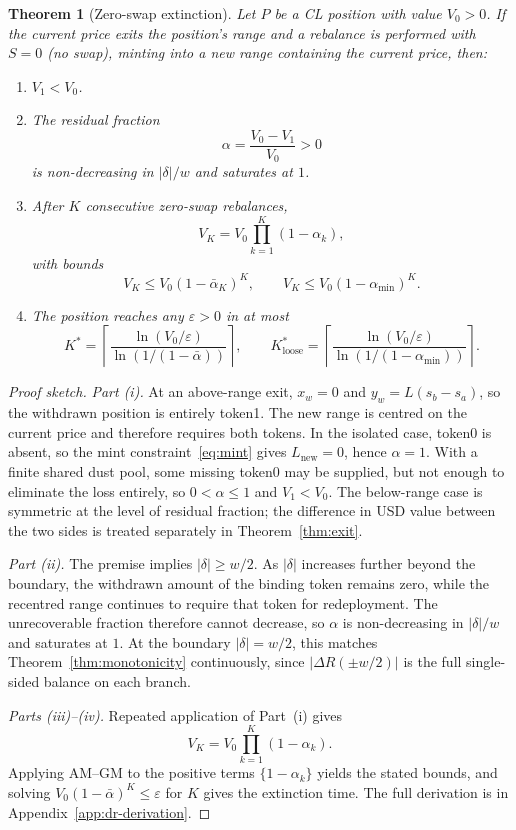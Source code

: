 \documentclass[11pt,a4paper]{article}
\theoremstyle{plain}
\newtheorem{theorem}{Theorem}
\begin{document}
\begin{theorem}[Zero-swap extinction]\label{thm:extinction}
Let $P$ be a CL position with value $V_0 > 0$. If the current price exits the position's range and a rebalance is performed with $S = 0$ (no swap), minting into a new range containing the current price, then:
\begin{enumerate}
\item $V_1 < V_0$.

\item The residual fraction
\[
\alpha = \frac{V_0 - V_1}{V_0} > 0
\]
is non-decreasing in $|\delta|/w$ and saturates at $1$.

\item After $K$ consecutive zero-swap rebalances,
\[
V_K = V_0 \prod_{k=1}^{K} (1 - \alpha_k),
\]
with bounds
\[
V_K \leq V_0(1 - \bar\alpha_K)^K,
\qquad
V_K \leq V_0(1 - \alpha_{\min})^K.
\]

\item The position reaches any $\varepsilon > 0$ in at most
\[
K^* = \left\lceil \frac{\ln(V_0/\varepsilon)}{\ln(1/(1 - \bar\alpha))} \right\rceil,
\qquad
K^*_{\text{loose}} = \left\lceil \frac{\ln(V_0/\varepsilon)}{\ln(1/(1 - \alpha_{\min}))} \right\rceil.
\]
\end{enumerate}
\end{theorem}

\begin{proof}[Proof sketch]
\emph{Part (i).} At an above-range exit, $x_w = 0$ and $y_w = L(s_b - s_a)$, so the withdrawn position is entirely token1. The new range is centred on the current price and therefore requires both tokens. In the isolated case, token0 is absent, so the mint constraint~\eqref{eq:mint} gives $L_{\text{new}} = 0$, hence $\alpha = 1$. With a finite shared dust pool, some missing token0 may be supplied, but not enough to eliminate the loss entirely, so $0 < \alpha \leq 1$ and $V_1 < V_0$. The below-range case is symmetric at the level of residual fraction; the difference in USD value between the two sides is treated separately in Theorem~\ref{thm:exit}.

\emph{Part (ii).} The premise implies $|\delta| \geq w/2$. As $|\delta|$ increases further beyond the boundary, the withdrawn amount of the binding token remains zero, while the recentred range continues to require that token for redeployment. The unrecoverable fraction therefore cannot decrease, so $\alpha$ is non-decreasing in $|\delta|/w$ and saturates at $1$. At the boundary $|\delta| = w/2$, this matches Theorem~\ref{thm:monotonicity} continuously, since $|\Delta R(\pm w/2)|$ is the full single-sided balance on each branch.

\emph{Parts (iii)--(iv).} Repeated application of Part~(i) gives
\[
V_K = V_0 \prod_{k=1}^{K} (1 - \alpha_k).
\]
Applying AM--GM to the positive terms $\{1 - \alpha_k\}$ yields the stated bounds, and solving $V_0(1 - \bar\alpha)^K \leq \varepsilon$ for $K$ gives the extinction time. The full derivation is in Appendix~\ref{app:dr-derivation}.
\end{proof}
\end{document}
